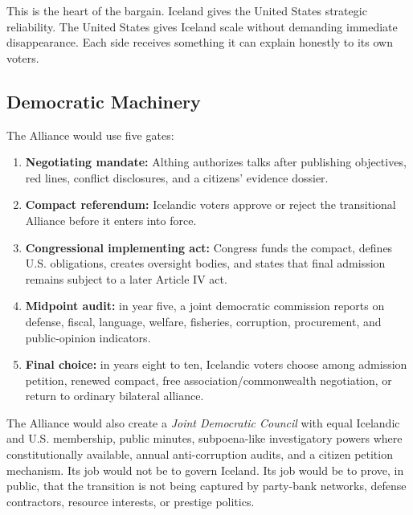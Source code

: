 \documentclass[11pt,a4paper]{article}
\begin{document}
This is the heart of the bargain. Iceland gives the United States strategic reliability. The United States gives Iceland scale without demanding immediate disappearance. Each side receives something it can explain honestly to its own voters.

\subsection{Democratic Machinery}
The Alliance would use five gates:

\begin{enumerate}
  \item \textbf{Negotiating mandate:} Althing authorizes talks after publishing objectives, red lines, conflict disclosures, and a citizens' evidence dossier.
  \item \textbf{Compact referendum:} Icelandic voters approve or reject the transitional Alliance before it enters into force.
  \item \textbf{Congressional implementing act:} Congress funds the compact, defines U.S. obligations, creates oversight bodies, and states that final admission remains subject to a later Article IV act.
  \item \textbf{Midpoint audit:} in year five, a joint democratic commission reports on defense, fiscal, language, welfare, fisheries, corruption, procurement, and public-opinion indicators.
  \item \textbf{Final choice:} in years eight to ten, Icelandic voters choose among admission petition, renewed compact, free association/commonwealth negotiation, or return to ordinary bilateral alliance.
\end{enumerate}

The Alliance would also create a \textit{Joint Democratic Council} with equal Icelandic and U.S. membership, public minutes, subpoena-like investigatory powers where constitutionally available, annual anti-corruption audits, and a citizen petition mechanism. Its job would not be to govern Iceland. Its job would be to prove, in public, that the transition is not being captured by party-bank networks, defense contractors, resource interests, or prestige politics.
\end{document}
